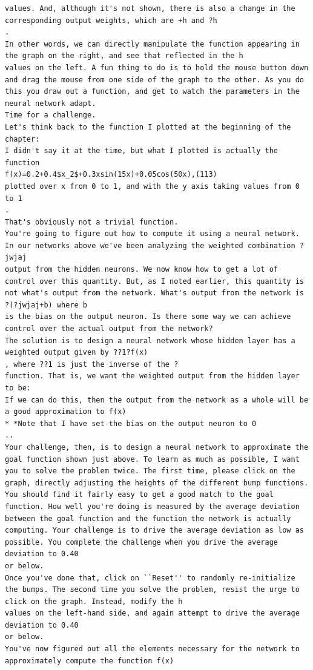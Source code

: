 \begin{lstlisting}
values. And, although it's not shown, there is also a change in the corresponding output weights, which are +h and ?h
.
In other words, we can directly manipulate the function appearing in the graph on the right, and see that reflected in the h
values on the left. A fun thing to do is to hold the mouse button down and drag the mouse from one side of the graph to the other. As you do this you draw out a function, and get to watch the parameters in the neural network adapt.
Time for a challenge.
Let's think back to the function I plotted at the beginning of the chapter:
I didn't say it at the time, but what I plotted is actually the function 
f(x)=0.2+0.4$x_2$+0.3xsin(15x)+0.05cos(50x),(113)
plotted over x from 0 to 1, and with the y axis taking values from 0 to 1
.
That's obviously not a trivial function.
You're going to figure out how to compute it using a neural network.
In our networks above we've been analyzing the weighted combination ?jwjaj
output from the hidden neurons. We now know how to get a lot of control over this quantity. But, as I noted earlier, this quantity is not what's output from the network. What's output from the network is ?(?jwjaj+b) where b
is the bias on the output neuron. Is there some way we can achieve control over the actual output from the network?
The solution is to design a neural network whose hidden layer has a weighted output given by ??1?f(x)
, where ??1 is just the inverse of the ?
function. That is, we want the weighted output from the hidden layer to be:
If we can do this, then the output from the network as a whole will be a good approximation to f(x)
* *Note that I have set the bias on the output neuron to 0
..
Your challenge, then, is to design a neural network to approximate the goal function shown just above. To learn as much as possible, I want you to solve the problem twice. The first time, please click on the graph, directly adjusting the heights of the different bump functions. You should find it fairly easy to get a good match to the goal function. How well you're doing is measured by the average deviation between the goal function and the function the network is actually computing. Your challenge is to drive the average deviation as low as possible. You complete the challenge when you drive the average deviation to 0.40
or below.
Once you've done that, click on ``Reset'' to randomly re-initialize the bumps. The second time you solve the problem, resist the urge to click on the graph. Instead, modify the h
values on the left-hand side, and again attempt to drive the average deviation to 0.40
or below.
You've now figured out all the elements necessary for the network to approximately compute the function f(x)

\end{lstlisting}
